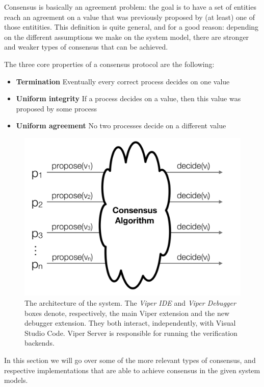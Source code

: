Consensus is basically an agreement problem: the goal is to have a set of entities reach an agreement on a value that was previously proposed by (at least) one of those entitities. This definition is quite general, and for a good reason: depending on the different assumptions we make on the system model, there are stronger and weaker types of consensus that can be achieved. 

The three core properties of a consensus protocol are the following:

\begin{itemize}
    \item \textbf{Termination} Eventually every correct process decides on one value
    \item \textbf{Uniform integrity} If a process decides on a value, then this value was proposed by some process
    \item \textbf{Uniform agreement} No two processes decide on a different value
    \end{itemize}

\begin{figure}[htb]
  \centering
  \includegraphics{img/consensus.png}
  \caption[The architecture of the system]{ The architecture of the system. The
    \textit{Viper IDE} and \textit{Viper Debugger} boxes denote, respectively,
    the main Viper extension and the new debugger extension. They both interact,
    independently, with Visual Studio Code. Viper Server is responsible for
    running the verification backends.}
  \label{fig:consensus}
\end{figure}

In this section we will go over some of the more relevant types of consensus, and respective implementations that are able to achieve consensus in the given system models.


